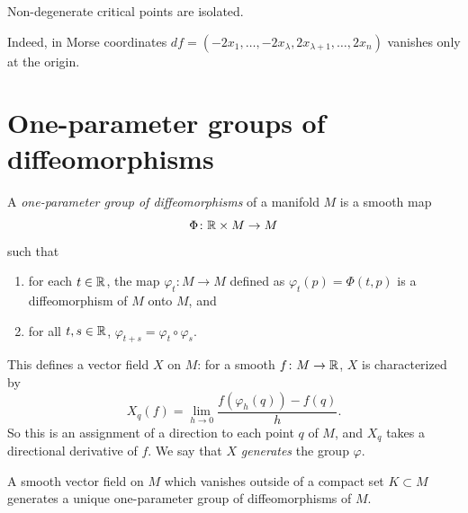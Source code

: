 \begin{corollary}
\label{L9:cor:isolated}
Non-degenerate critical points are isolated.
\end{corollary}
\begin{addedblock}
Indeed, in Morse coordinates $df=(-2x_1,\dots,-2x_\lambda,2x_{\lambda+1},\dots,2x_n)$ vanishes
only at the origin.
\end{addedblock}

\section{One-parameter groups of diffeomorphisms}
\label{L9:sec:oneparam}

\begin{definition}
\label{L9:def:oneparam}
A \emph{one-parameter group of diffeomorphisms} of a manifold $M$ is a smooth map
\[
  \Phi\colon\mathbb{R}\times M\to M
\]
such that
\begin{enumerate}[nosep]
  \item for each $t\in\mathbb{R}$, the map $\varphi_t\colon M\to M$ defined as
        $\varphi_t(p)=\Phi(t,p)$ is a diffeomorphism of $M$ onto $M$, and
  \item for all $t,s\in\mathbb{R}$, $\varphi_{t+s}=\varphi_t\circ\varphi_s$.
\end{enumerate}
\end{definition}

This defines a vector field $X$ on $M$: for a smooth $f\colon M\to\mathbb{R}$, $X$ is characterized by
\[
  X_q(f)=\lim_{h\to0}\frac{f(\varphi_h(q))-f(q)}{h}.
\]
So this is an assignment of a direction to each point $q$ of $M$, and $X_q$ takes a
directional derivative of $f$. We say that $X$ \emph{generates} the group $\varphi$.

\begin{lemma}
\label{L9:lem:flow}
A smooth vector field on $M$ which vanishes outside of a compact set $K\subset M$ generates
a unique one-parameter group of diffeomorphisms of $M$.
\end{lemma}

